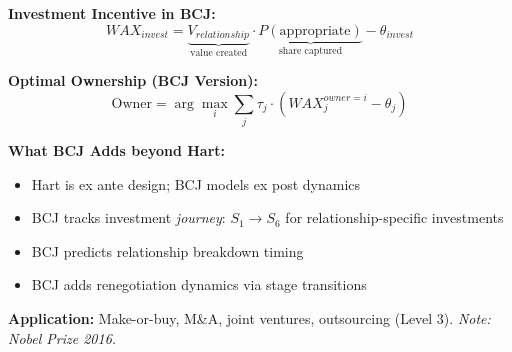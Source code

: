 \begin{tcolorbox}[colback=green!5!white, colframe=green!75!black,
    title=Theorem BCJ-T38: Hart Incomplete Contracts as Special Case]
\textbf{Investment Incentive in BCJ:}
\begin{equation}
WAX_{invest} = \underbrace{V_{relationship}}_{\text{value created}} \cdot \underbrace{P(\text{appropriate})}_{\text{share captured}} - \theta_{invest}
\end{equation}

\textbf{Optimal Ownership (BCJ Version):}
\begin{equation}
\text{Owner} = \arg\max_i \sum_j \tau_j \cdot (WAX_j^{owner=i} - \theta_j)
\end{equation}

\textbf{What BCJ Adds beyond Hart:}
\begin{itemize}[nosep]
\item Hart is ex ante design; BCJ models ex post dynamics
\item BCJ tracks investment \textit{journey}: $S_1 \to S_6$ for relationship-specific investments
\item BCJ predicts relationship breakdown timing
\item BCJ adds renegotiation dynamics via stage transitions
\end{itemize}

\textbf{Application:} Make-or-buy, M\&A, joint ventures, outsourcing (Level 3). \textit{Note: Nobel Prize 2016.}
\end{tcolorbox}


